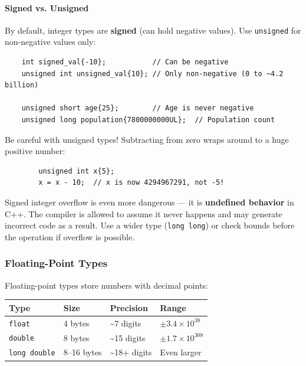 \paragraph{Signed vs. Unsigned}

By default, integer types are \textbf{signed} (can hold negative values). Use \texttt{unsigned} for non-negative values only:

\begin{lstlisting}
	int signed_val{-10};           // Can be negative
	unsigned int unsigned_val{10}; // Only non-negative (0 to ~4.2 billion)
	
	unsigned short age{25};        // Age is never negative
	unsigned long population{7800000000UL};  // Population count
\end{lstlisting}

\begin{remark}
	Be careful with unsigned types! Subtracting from zero wraps around to a huge positive number:

	\begin{lstlisting}
		unsigned int x{5};
		x = x - 10;  // x is now 4294967291, not -5!
	\end{lstlisting}

	Signed integer overflow is even more dangerous — it is \textbf{undefined behavior} in C++. The compiler is allowed to assume it never happens and may generate incorrect code as a result. Use a wider type (\texttt{long long}) or check bounds before the operation if overflow is possible.
\end{remark}

\subsubsection{Floating-Point Types}

Floating-point types store numbers with decimal points:

\begin{center}
	\begin{tabular}{|l|l|l|l|}
		\hline
		\textbf{Type} & \textbf{Size} & \textbf{Precision} & \textbf{Range} \\
		\hline
		\texttt{float} & 4 bytes & \textasciitilde{}7 digits & $\pm 3.4 \times 10^{38}$ \\
		\texttt{double} & 8 bytes & \textasciitilde{}15 digits & $\pm 1.7 \times 10^{308}$ \\
		\texttt{long double} & 8--16 bytes & \textasciitilde{}18+ digits & Even larger \\
		\hline
	\end{tabular}
\end{center}

